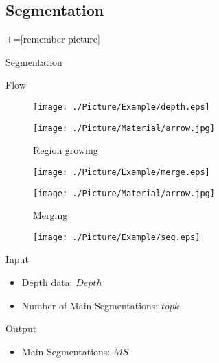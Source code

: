 \documentclass[xcolor=table,compress,blue]{beamer}
\begin{document}
\subsection{Segmentation}
\label{ALG-SEG}
+=[remember picture] %
\begin{frame}{Segmentation}
	\begin{exampleblock}{Flow}
		\begin{figure}[htpb]
			\centering
			\begin{minipage}[b]{0.8in}
				\centerline{ \texttt{[image: ./Picture/Example/depth.eps]} }
			\end{minipage}
			\begin{minipage}[b]{0.8in}
				\centerline{ \texttt{[image: ./Picture/Material/arrow.jpg]} }
				\centerline{\tiny{Region growing}}
			\end{minipage}
			\begin{minipage}[b]{0.8in}
				\centerline{ \texttt{[image: ./Picture/Example/merge.eps]} }
			\end{minipage}
			\begin{minipage}[b]{0.8in}
				\centerline{ \texttt{[image: ./Picture/Material/arrow.jpg]} }
				\centerline{\tiny{Merging}}
			\end{minipage}
			\begin{minipage}[b]{0.8in}
				\centerline{ \texttt{[image: ./Picture/Example/seg.eps]} }
			\end{minipage}
		\end{figure}
	\end{exampleblock}
	\begin{exampleblock}{Input}
		\begin{itemize}		
			\item  Depth data: $Depth$
			\item  Number of Main Segmentations: ${topk}$
		\end{itemize}
	\end{exampleblock}
	\begin{exampleblock}{Output}
		\begin{itemize}		
			\item  Main Segmentations: ${MS}$
		\end{itemize}
	\end{exampleblock}
\end{frame}
\end{document}
